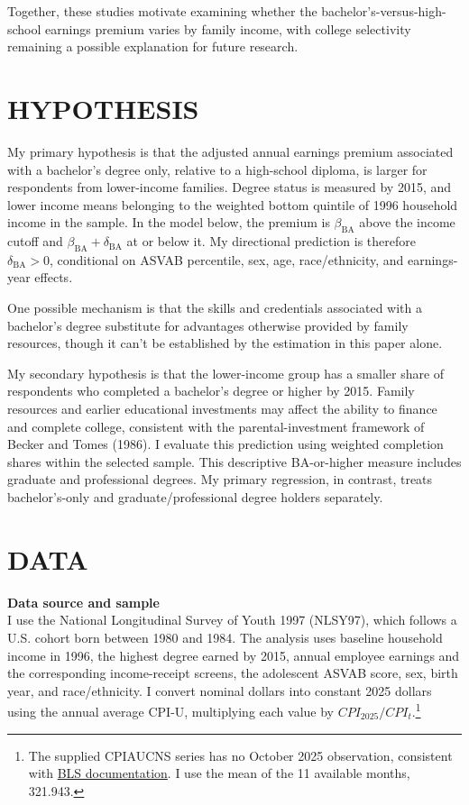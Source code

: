 \documentclass[12pt,letterpaper]{article}
\begin{document}
Together, these studies motivate examining whether the bachelor's-versus-high-school 
earnings premium varies by family income, with college selectivity remaining a possible
 explanation for future research.

\section*{HYPOTHESIS}
My primary hypothesis is that the adjusted annual earnings premium associated with
a bachelor's degree only, relative to a high-school diploma, is larger for respondents
from lower-income families. Degree status is measured by 2015, and lower income
means belonging to the weighted bottom quintile of 1996 household income in the sample. 
In the model below, the premium is $\beta_{\mathrm{BA}}$ above the
income cutoff and $\beta_{\mathrm{BA}}+\delta_{\mathrm{BA}}$ at or below it.
My directional prediction is therefore $\delta_{\mathrm{BA}}>0$,
conditional on ASVAB percentile, sex, age, race/ethnicity, and earnings-year effects.\newline

One possible mechanism is that the skills and credentials associated with a
bachelor's degree substitute for advantages otherwise provided by family resources, 
though it can't be established by the estimation in this paper alone. \newline

My secondary hypothesis is that the lower-income group has a smaller share of
respondents who completed a bachelor's degree or higher by 2015. Family resources
and earlier educational investments may affect the ability to finance and complete
college, consistent with the parental-investment framework of Becker and Tomes
(1986). I evaluate this prediction using weighted completion shares within the
selected sample. This descriptive BA-or-higher measure includes graduate and
professional degrees. My primary regression, in contrast, treats bachelor's-only and
graduate/professional degree holders separately.\newline

\section*{DATA}
\textbf{Data source and sample}\\
I use the National Longitudinal Survey of Youth 1997 (NLSY97), which follows a
U.S. cohort born between 1980 and 1984. The analysis uses baseline household
income in 1996, the highest degree earned
by 2015, annual employee earnings and the corresponding income-receipt screens,
the adolescent ASVAB score, sex, birth year, and race/ethnicity. I convert nominal dollars into constant 2025 dollars using the annual average CPI-U,
multiplying each value by $CPI_{2025}/CPI_t$.\footnote{The supplied CPIAUCNS series
has no October 2025 observation, consistent with
\href{https://www.bls.gov/news.release/archives/cpi_12182025.htm}{BLS documentation}.
I use the mean of the 11 available months, 321.943.}\newline
\end{document}
